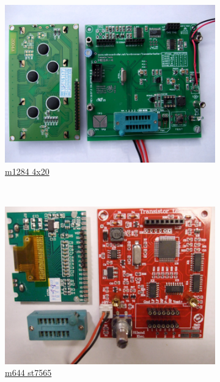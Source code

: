 \documentclass[pdftex,12pt,a4paper,english]{article}
\begin{document}
\begin{figure}[H]
  \begin{subfigure}[b]{.3\textwidth}
    \centering
    \includegraphics[width=1.\textwidth]{../PNG/m644_4x20.JPG}
	  \\ \vspace{-0.5em}
	  {\href{run:./trunk/mega644_LCD2004/.}{m1284 4x20}}
  \end{subfigure}
~
  \begin{subfigure}[b]{.3\textwidth}	%
    \centering
    \includegraphics[width=1.\textwidth]{../PNG/m644_hiland.JPG}
	  \\ \vspace{-0.5em}
	  {\href{run:./trunk/mega644_hiland_m644/.}{m644 st7565}}

\end{subfigure}
\end{figure}
\end{document}
